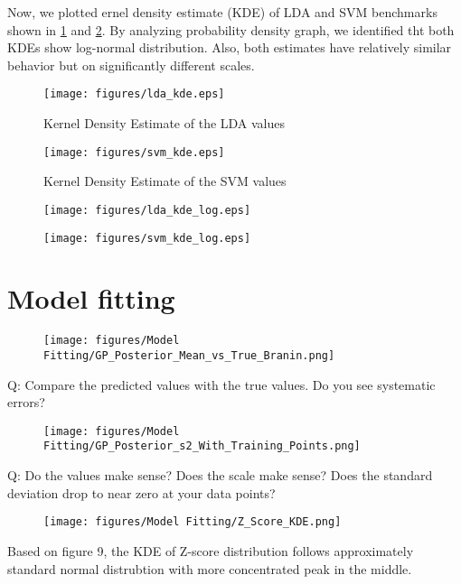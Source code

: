 \documentclass[11pt]{article}
\numberwithin{equation}{section}
\begin{document}
Now, we plotted ernel density estimate (KDE) of LDA and SVM benchmarks shown in \ref{fig:lda_kde} and \ref{fig:svm_kde}. By analyzing probability density graph, we identified tht both KDEs show log-normal distribution. Also, both estimates have relatively similar behavior but on significantly different scales.



\begin{figure}[H]
  \centering
  \texttt{[image: figures/lda\_kde.eps]}
  \caption{Kernel Density Estimate of the LDA values}
  \label{fig:lda_kde}
\end{figure}
\begin{figure}[H]
  \centering
  \texttt{[image: figures/svm\_kde.eps]}
  \caption{Kernel Density Estimate of the SVM values}
  \label{fig:svm_kde}
\end{figure}



\begin{figure}[H]
  \centering
  \texttt{[image: figures/lda\_kde\_log.eps]}
  \caption{}
  \label{}
\end{figure}
\begin{figure}[H]
  \centering
  \texttt{[image: figures/svm\_kde\_log.eps]}
  \caption{}
  \label{}
\end{figure}

\section*{Model fitting}

\begin{figure}[H]
  \centering
  \texttt{[image: figures/Model Fitting/GP\_Posterior\_Mean\_vs\_True\_Branin.png]}
  \caption{}
  \label{}
\end{figure}
Q: Compare
the predicted values with the true values. Do you see systematic errors?

\begin{figure}[H]
  \centering
  \texttt{[image: figures/Model Fitting/GP\_Posterior\_s2\_With\_Training\_Points.png]}
  \caption{}
  \label{}
\end{figure}
Q: Do the values make sense? Does the scale make sense? Does the standard
deviation drop to near zero at your data points?

\begin{figure}[H]
  \centering
  \texttt{[image: figures/Model Fitting/Z\_Score\_KDE.png]}
  \caption{}
  \label{}
\end{figure}
Based on figure 9, the KDE of Z-score distribution follows approximately standard normal distrubtion with more concentrated peak in the middle.
\end{document}
